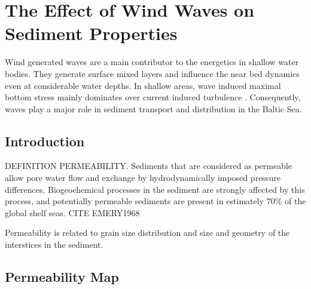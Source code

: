 \chapter{The Effect of Wind Waves on Sediment Properties}
\label{kap-waves}

Wind generated waves are a main contributor to the energetics in shallow water 
bodies. They generate surface mixed layers and influence the near bed dynamics 
even at considerable water depths. In shallow areas, wave induced maximal 
bottom stress mainly dominates over current induced turbulence 
\citep[][]{jonsson2004}. Consequently, waves play a major role in sediment 
transport and distribution in the Baltic Sea.

\section{Introduction}

DEFINITION PERMEABILITY. Sediments that are considered as permeable allow pore 
water flow and exchange by hydrodynamically imposed pressure differences. 
Biogeochemical processes in the sediment are strongly affected by this process, 
and potentially permeable sediments are present in estimately 70$\%$ of the 
global shelf seas. CITE EMERY1968

Permeability is related to grain size distribution and size and geometry of the 
interstices in the sediment. 



\section{Permeability Map}

